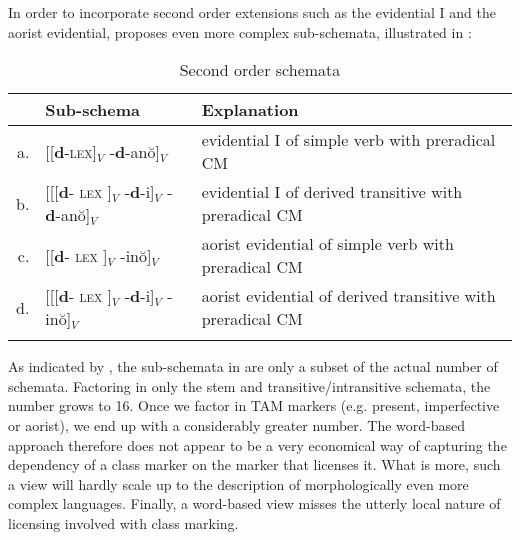 \documentclass[output=paper]{langsci/langscibook}
\begin{document}
In order to incorporate second order extensions such as the evidential
I and the aorist evidential, \citet{Harris09} proposes even more
complex sub-schemata, illustrated in :

\begin{table}
  \caption{Second order schemata\label{ex:HarrisSecondOrder}}
  \begin{tabularx}{\textwidth}{rlQ}
    \lsptoprule
    &  Sub-schema
    & Explanation\\
    \midrule
    a. & [[\textbf{d}-\textsc{lex}]$_V$ -\textbf{d}-anŏ]$_V$  & evidential I of simple verb with preradical CM\\
    b. & [[[\textbf{d}- \textsc{lex} ]$_V$  -\textbf{d}-i]$_V$  -\textbf{d}-anŏ]$_V$  & evidential I of derived transitive with preradical CM\\
    c. & [[\textbf{d}- \textsc{lex} ]$_V$ -inŏ]$_V$  & aorist evidential of simple verb with preradical CM\\
    d. & [[[\textbf{d}- \textsc{lex} ]$_V$  -\textbf{d}-i]$_V$ -inŏ]$_V$ & aorist evidential of derived transitive with preradical CM\\
    \lspbottomrule
  \end{tabularx}
\end{table}

As indicated by \citet{Harris09}, the sub-schemata in
 are only a subset of the actual number of
schemata. Factoring in only the stem and transitive/intransitive
schemata, the number grows to 16. Once we factor in TAM markers
(e.g. present, imperfective or aorist), we end up with a considerably
greater number. The word-based approach therefore does not appear to
be a very economical way of capturing the dependency of a class marker
on the marker that licenses it. What is more, such a view will hardly
scale up to the description of morphologically even more complex
languages. Finally, a word-based view misses the utterly local nature
of licensing involved with class marking.
\end{document}
